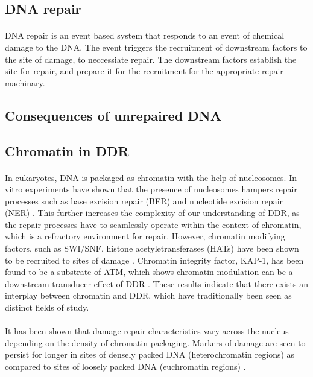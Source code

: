 \subsection{DNA repair}
\paragraph*{} DNA repair is an event based system that responds to an event of chemical damage to the DNA. The event triggers the recruitment of downstream factors to the site of damage, to neccessiate repair. The downstream factors establish the site for repair, and prepare it for the recruitment for the appropriate repair machinary.

\subsection{Consequences of unrepaired DNA}

\subsection{Chromatin in DDR}
\paragraph*{} In eukaryotes, DNA is packaged as chromatin with the help of nucleosomes. In-vitro experiments have shown that the presence of nucleosomes hampers repair processes such as base excision repair (BER) and nucleotide excision repair (NER) \cite{hara2000dna, odell2011nucleosome}. This further increases the complexity of our understanding of DDR, as the repair processes have to seamlessly operate within the context of chromatin, which is a refractory environment for repair. However, chromatin modifying factors, such as SWI/SNF, histone acetyletransferases (HATs) have been shown to be recruited to sites of damage \cite{park2006mammalian, polo2010regulation}. Chromatin integrity factor, KAP-1, has been found to be a substrate of ATM, which shows chromatin modulation can be a downstream transducer effect of DDR \cite{ziv2006chromatin}. These results indicate that there exists an interplay between chromatin and DDR, which have traditionally been seen as distinct fields of study.

\paragraph*{} It has been shown that damage repair characteristics vary across the nucleus depending on the density of chromatin packaging. Markers of damage are seen to persist for longer in sites of densely packed DNA (heterochromatin regions) as compared to sites of loosely packed DNA (euchromatin regions) \cite{goodarzi2008atm}.


